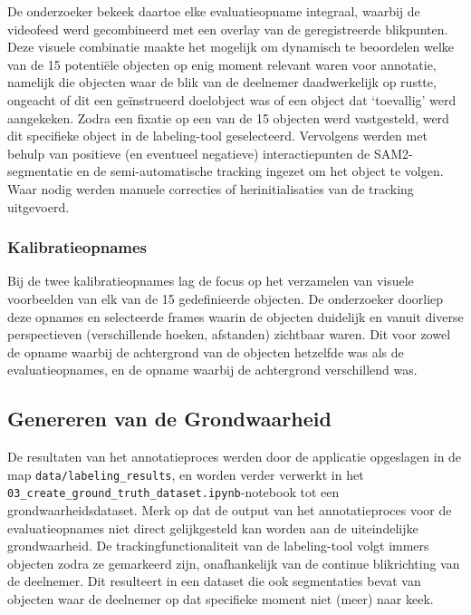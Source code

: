 De onderzoeker bekeek daartoe elke evaluatieopname integraal, waarbij de videofeed werd gecombineerd met een overlay 
van de geregistreerde blikpunten. Deze visuele combinatie maakte het mogelijk om dynamisch te beoordelen welke van de 15 potentiële 
objecten op enig moment relevant waren voor annotatie, namelijk die objecten waar de blik van de deelnemer daadwerkelijk op rustte, 
ongeacht of dit een geïnstrueerd doelobject was of een object dat `toevallig' werd aangekeken. 
Zodra een fixatie op een van de 15 objecten werd vastgesteld, werd dit specifieke object in de labeling-tool geselecteerd. 
Vervolgens werden met behulp van positieve (en eventueel negatieve) interactiepunten de SAM2-segmentatie en de semi-automatische 
tracking ingezet om het object te volgen. Waar nodig werden manuele correcties of herinitialisaties van de tracking uitgevoerd.

\subsubsection{Kalibratieopnames}

Bij de twee kalibratieopnames lag de focus op het verzamelen van visuele voorbeelden van elk van de 15 gedefinieerde objecten. 
De onderzoeker doorliep deze opnames en selecteerde frames waarin de objecten duidelijk en vanuit diverse perspectieven 
(verschillende hoeken, afstanden) zichtbaar waren.
Dit voor zowel de opname waarbij de achtergrond van de objecten hetzelfde was als de evaluatieopnames, 
en de opname waarbij de achtergrond verschillend was.

\subsection{Genereren van de Grondwaarheid}

De resultaten van het annotatieproces werden door de applicatie opgeslagen in de map \texttt{data/labeling\_results}, en worden 
verder verwerkt in het \texttt{03\_create\_ground\_truth\_dataset.ipynb}-notebook tot een grondwaarheidsdataset.
Merk op dat de output van het annotatieproces voor de evaluatieopnames niet direct gelijkgesteld kan worden aan de uiteindelijke grondwaarheid. 
De trackingfunctionaliteit van de labeling-tool volgt immers objecten zodra ze gemarkeerd zijn, onafhankelijk van de continue blikrichting van de deelnemer. 
Dit resulteert in een dataset die ook segmentaties bevat van objecten waar de deelnemer op dat specifieke moment niet (meer) naar keek.

